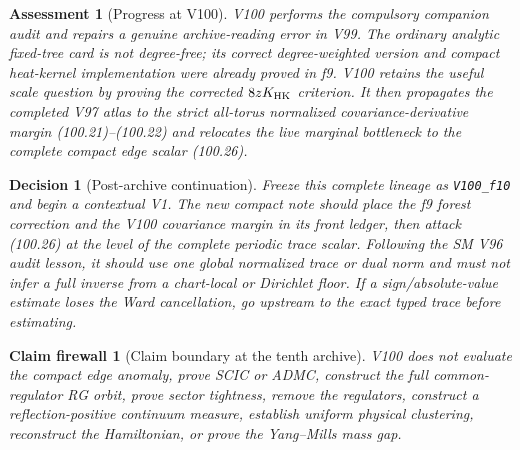 \documentclass[11pt,oneside]{article}
\newtheorem{assessment}[theorem]{Assessment}
\newtheorem{firewall}[theorem]{Claim firewall}
\newtheorem{decision}[theorem]{Decision}
\theoremstyle{definition}
\theoremstyle{remark}
\begin{document}
\begin{assessment}[Progress at V100]
\label{ass:newv100}
V100 performs the compulsory companion audit and repairs a genuine
archive-reading error in V99.  The ordinary analytic fixed-tree
card is not degree-free; its correct degree-weighted version and
compact heat-kernel implementation were already proved in f9.
V100 retains the useful scale question by proving the corrected
\(8zK_{\rm HK}\) criterion.  It then propagates the completed V97
atlas to the strict all-torus normalized covariance-derivative
margin (100.21)--(100.22) and relocates the live marginal
bottleneck to the complete compact edge scalar (100.26).
\end{assessment}

\begin{decision}[Post-archive continuation]
\label{dec:newv100-next}
Freeze this complete lineage as \texttt{V100\_f10} and begin a
contextual V1.  The new compact note should place the f9 forest
correction and the V100 covariance margin in its front ledger, then
attack (100.26) at the level of the complete periodic trace scalar.
Following the SM V96 audit lesson, it should use one global
normalized trace or dual norm and must not infer a full inverse from
a chart-local or Dirichlet floor.  If a sign/absolute-value estimate
loses the Ward cancellation, go upstream to the exact typed trace
before estimating.
\end{decision}

\begin{firewall}[Claim boundary at the tenth archive]
\label{fire:newv100-final}
V100 does not evaluate the compact edge anomaly, prove SCIC or
ADMC, construct the full common-regulator RG orbit, prove sector
tightness, remove the regulators, construct a reflection-positive
continuum measure, establish uniform physical clustering, reconstruct
the Hamiltonian, or prove the Yang--Mills mass gap.
\end{firewall}
\end{document}
